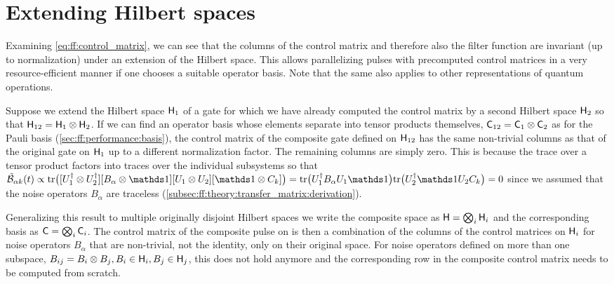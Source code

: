 \section{Extending Hilbert spaces}\label{sec:ff:performance:extending_hilbert_spaces}
Examining \cref{eq:ff:control_matrix}, we can see that the columns of the control matrix and therefore also the filter function are invariant (up to normalization) under an extension of the Hilbert space.
This allows parallelizing pulses with precomputed control matrices in a very resource-efficient manner if one chooses a suitable operator basis.
Note that the same also applies to other representations of quantum operations.

Suppose we extend the Hilbert space $\mathsf{H}_1$ of a gate for which we have already computed the control matrix by a second Hilbert space $\mathsf{H}_2$ so that $\mathsf{H}_{12} = \mathsf{H}_1\otimes\mathsf{H}_2$.
If we can find an operator basis whose elements separate into tensor products themselves, \ie $\mathsf{C}_{12} = \mathsf{C}_1\otimes\mathsf{C}_2$ as for the Pauli basis (\cf \cref{sec:ff:performance:basis}), the control matrix of the composite gate defined on $\mathsf{H}_{12}$ has the same non-trivial columns as that of the original gate on $\mathsf{H}_1$ up to a different normalization factor.
The remaining columns are simply zero.
This is because the trace over a tensor product factors into traces over the individual subsystems so that $\ctrlmat_{\alpha k}(t)\propto\mr{tr}\bigl([U_1\adjoint\otimes U_2\adjoint][B_\alpha\otimes\eye][U_1\otimes U_2][\eye\otimes C_k]\bigr) = \mr{tr}\bigl(U_1\adjoint B_\alpha U_1\eye\bigr)\mr{tr}\bigl(U_2\adjoint\eye U_2 C_k\bigr) = 0$ since we assumed that the noise operators $B_\alpha$ are traceless (\cf \cref{subsec:ff:theory:transfer_matrix:derivation}).

Generalizing this result to multiple originally disjoint Hilbert spaces we write the composite space as $\mathsf{H} = \bigotimes_i\mathsf{H}_i$ and the corresponding basis as $\mathsf{C} = \bigotimes_i\mathsf{C}_i$.
The control matrix of the composite pulse on \Hspace is then a combination of the columns of the control matrices on $\mathsf{H}_i$ for noise operators $B_\alpha$ that are non-trivial, \ie not the identity, only on their original space.
For noise operators defined on more than one subspace, \eg $B_{ij} = B_i\otimes B_j, B_i\in\mathsf{H}_i, B_j\in\mathsf{H}_j$, this does not hold anymore and the corresponding row in the composite control matrix needs to be computed from scratch.

